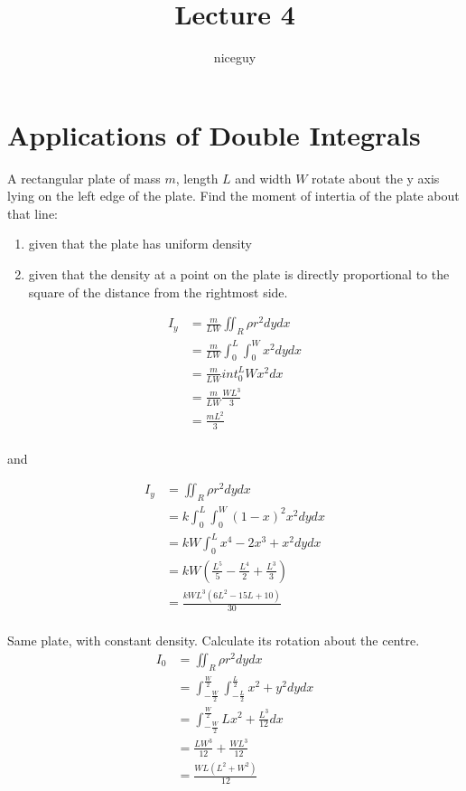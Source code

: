 \documentclass[12pt]{article}
\author{niceguy}
\title{Lecture 4}
\begin{document}
\maketitle

\section{Applications of Double Integrals}

\begin{ex}
	A rectangular plate of mass $m$, length $L$ and width $W$ rotate about the y axis lying on the left edge of the plate. Find the moment of intertia of the plate about that line: \\
	\begin{enumerate}
		\item given that the plate has uniform density \\
		\item given that the density at a point on the plate is directly proportional to the square of the distance from the rightmost side.
	\end{enumerate}
	\begin{align*}
		I_y &= \frac{m}{LW} \iint_R \rho r^2 dydx \\
		    &= \frac{m}{LW} \int_0^L \int_0^W x^2 dydx \\
		    &= \frac{m}{LW} int_0^L Wx^2 dx \\
		    &= \frac{m}{LW} \frac{WL^3}{3} \\
		    &= \frac{mL^2}{3} \\
	\end{align*}

	and

	\begin{align*}
		I_y &= \iint_R \rho r^2 dydx \\
		      &= k \int_0^L \int_0^W (1-x)^2x^2 dydx \\
		      &= kW \int_0^L x^4 - 2x^3 + x^2 dydx \\
		      &= kW \left(\frac{L^5}{5} - \frac{L^4}{2} + \frac{L^3}{3}\right) \\
		      &= \frac{kWL^3(6L^2 - 15L + 10)}{30} \\
	\end{align*}
\end{ex}

\begin{ex}
	Same plate, with constant density. Calculate its rotation about the centre.
	\begin{align*}
		I_0 &= \iint_R \rho r^2 dydx \\
		    &= \int_{-\frac{W}{2}}^{\frac{W}{2}} \int_{-\frac{L}{2}}^{\frac{L}{2}} x^2 + y^2 dydx \\
		    &= \int_{-\frac{W}{2}}^{\frac{W}{2}} Lx^2 + \frac{L^3}{12} dx \\
		    &= \frac{LW^3}{12} + \frac{WL^3}{12} \\
		    &= \frac{WL(L^2 + W^2)}{12} \\
	\end{align*}
\end{ex}
\end{document}
